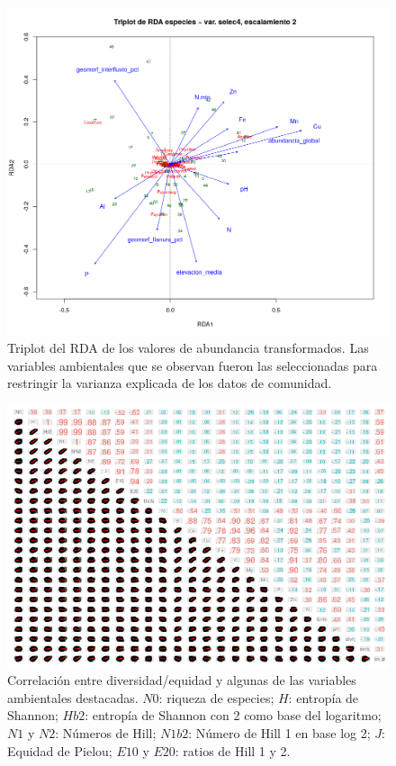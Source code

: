 \documentclass[11pt,]{article}
\begin{document}
\begin{figure}
\centering
\includegraphics{rda_triplot_var_selec_4_escal2.png}
\caption{Triplot del RDA de los valores de abundancia transformados. Las
variables ambientales que se observan fueron las seleccionadas para
restringir la varianza explicada de los datos de comunidad.
\label{fig:rda_triplot_var_selec_4_escal2}}
\end{figure}

\begin{figure}
\centering
\includegraphics{panel_cor_indcs_diversidad1_columnas_quitadas.png}
\caption{Correlación entre diversidad/equidad y algunas de las variables
ambientales destacadas. \(N0\): riqueza de especies; \(H\): entropía de
Shannon; \(Hb2\): entropía de Shannon con 2 como base del logaritmo;
\(N1\) y \(N2\): Números de Hill; \(N1b2\): Número de Hill 1 en base log
2; \(J\): Equidad de Pielou; \(E10\) y \(E20\): ratios de Hill 1 y 2.
\label{fig:panel_cor_indics_diversidad1_columnnas_quitadas}}
\end{figure}
\end{document}
